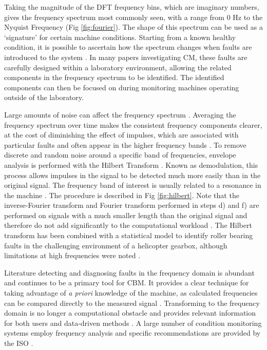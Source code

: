 Taking the magnitude of the DFT frequency bins, which are imaginary numbers, gives the frequency spectrum most commonly seen, with a range from 0 Hz to the Nyquist Frequency (Fig \ref{fig:fourier}).
The shape of this spectrum can be used as a `signature' for certain machine conditions.
Starting from a known healthy condition, it is possible to ascertain how the spectrum changes when faults are introduced to the system \cite{CM_randall}.
In many papers investigating CM, these faults are carefully designed within a laboratory environment, allowing the related components in the frequency spectrum to be identified.
The identified components can then be focused on during monitoring machines operating outside of the laboratory.
\par

Large amounts of noise can affect the frequency spectrum \cite{CM_randall}.
Averaging the frequency spectrum over time makes the consistent frequency components clearer, at the cost of diminishing the effect of impulses, which are associated with particular faults and often appear in the higher frequency bands \cite{CM_randall}.
To remove discrete and random noise around a specific band of frequencies, envelope analysis is performed with the Hilbert Transform \cite{CM_hilbert}.
Known as demodulation, this process allows impulses in the signal to be detected much more easily than in the original signal.
The frequency band of interest is usually related to a resonance in the machine \cite{CM_bonnardot}.
The procedure is described in Fig \ref{fig:hilbert}.
Note that the inverse-Fourier transform and Fourier transform performed in steps d) and f) are performed on signals with a much smaller length than the original signal and therefore do not add significantly to the computational workload \cite{CM_hilbert}.
The Hilbert transform has been combined with a statistical model to identify roller bearing faults in the challenging environment of a helicopter gearbox, although limitations at high frequencies were noted \cite{CM_hilbert}.
\par

Literature detecting and diagnosing faults in the frequency domain is abundant and continues to be a primary tool for CBM.
It provides a clear technique for taking advantage of \textit{a priori} knowledge of the machine, as calculated frequencies can be compared directly to the measured signal \cite{CM_dai_gao_2013}.
Transforming to the frequency domain is no longer a computational obstacle and provides relevant information for both users and data-driven methods \cite{CM_randall}.
A large number of condition monitoring systems employ frequency analysis and specific recommendations are provided by the ISO \cite{CM_list_wind_CMS}\cite{ISO13373-1}.



